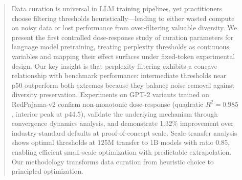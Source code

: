 \begin{abstract}
Data curation is universal in LLM training pipelines, yet practitioners choose filtering thresholds heuristically---leading to either wasted compute on noisy data or lost performance from over-filtering valuable diversity. We present the first controlled dose-response study of curation parameters for language model pretraining, treating perplexity thresholds as continuous variables and mapping their effect surfaces under fixed-token experimental design. Our key insight is that perplexity filtering exhibits a concave relationship with benchmark performance: intermediate thresholds near p50 outperform both extremes because they balance noise removal against diversity preservation. Experiments on GPT-2 variants trained on RedPajama-v2 confirm non-monotonic dose-response (quadratic $R^2=0.985$, interior peak at p44.5), validate the underlying mechanism through convergence dynamics analysis, and demonstrate 1.32\% improvement over industry-standard defaults at proof-of-concept scale. Scale transfer analysis shows optimal thresholds at 125M transfer to 1B models with ratio 0.85, enabling efficient small-scale optimization with predictable extrapolation. Our methodology transforms data curation from heuristic choice to principled optimization.
\end{abstract}

